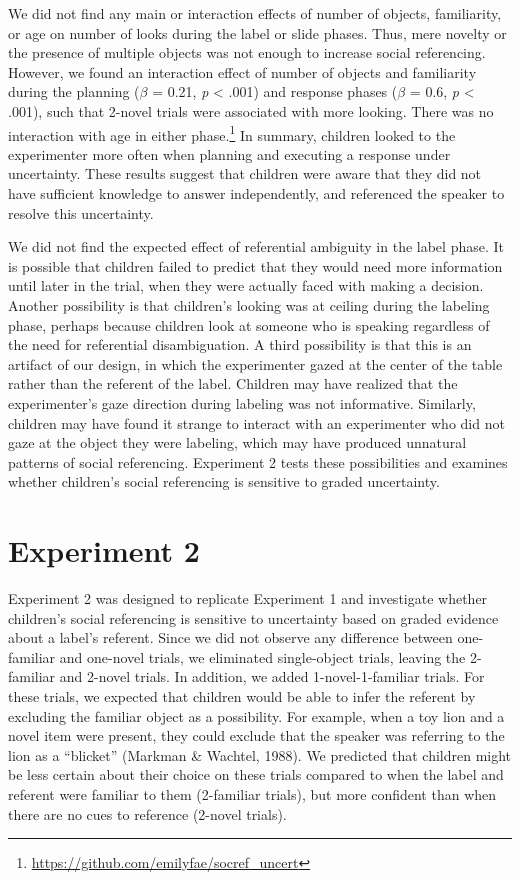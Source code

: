 \documentclass[10pt, letterpaper]{article}
\begin{document}
We did not find any main or interaction effects of number of objects,
familiarity, or age on number of looks during the label or slide phases.
Thus, mere novelty or the presence of multiple objects was not enough to
increase social referencing. However, we found an interaction effect of
number of objects and familiarity during the planning (\(\beta\) = 0.21,
\emph{p} \textless{} .001) and response phases (\(\beta\) = 0.6,
\emph{p} \textless{} .001), such that 2-novel trials were associated
with more looking. There was no interaction with age in either
phase.\footnote{\url{https://github.com/emilyfae/socref_uncert}} In
summary, children looked to the experimenter more often when planning
and executing a response under uncertainty. These results suggest that
children were aware that they did not have sufficient knowledge to
answer independently, and referenced the speaker to resolve this
uncertainty.

We did not find the expected effect of referential ambiguity in the
label phase. It is possible that children failed to predict that they
would need more information until later in the trial, when they were
actually faced with making a decision. Another possibility is that
children's looking was at ceiling during the labeling phase, perhaps
because children look at someone who is speaking regardless of the need
for referential disambiguation. A third possibility is that this is an
artifact of our design, in which the experimenter gazed at the center of
the table rather than the referent of the label. Children may have
realized that the experimenter's gaze direction during labeling was not
informative. Similarly, children may have found it strange to interact
with an experimenter who did not gaze at the object they were labeling,
which may have produced unnatural patterns of social referencing.
Experiment 2 tests these possibilities and examines whether children's
social referencing is sensitive to graded uncertainty.

\section{Experiment 2}\label{experiment-2}

Experiment 2 was designed to replicate Experiment 1 and investigate
whether children's social referencing is sensitive to uncertainty based
on graded evidence about a label's referent. Since we did not observe
any difference between one-familiar and one-novel trials, we eliminated
single-object trials, leaving the 2-familiar and 2-novel trials. In
addition, we added 1-novel-1-familiar trials. For these trials, we
expected that children would be able to infer the referent by excluding
the familiar object as a possibility. For example, when a toy lion and a
novel item were present, they could exclude that the speaker was
referring to the lion as a ``blicket'' (Markman \& Wachtel, 1988). We
predicted that children might be less certain about their choice on
these trials compared to when the label and referent were familiar to
them (2-familiar trials), but more confident than when there are no cues
to reference (2-novel trials).
\end{document}
